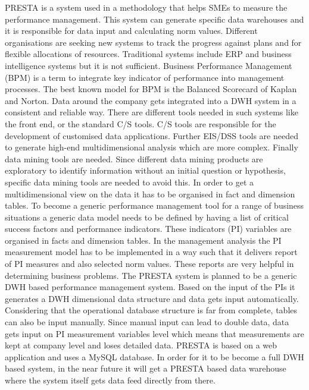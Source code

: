 \documentclass[../paper.tex]{subfiles}
\begin{document}
PRESTA is a system used in a methodology that helps SMEs to measure the performance management. This system can generate specific data warehouses and it is responsible for data input and calculating norm values. Different organisations are seeking new systems to track the progress against plans and for flexible allocations of resources. Traditional systems include ERP and business intelligence systems but it is not sufficient. Business Performance Management (BPM) is a term to integrate key indicator of performance into management processes. The best known model for BPM is the Balanced Scorecard of Kaplan and Norton. Data around the company gets integrated into a DWH system in a consistent and reliable way. There are different tools needed in such systems like the front end, or the standard C/S tools. C/S tools are responsible for the development of customised data applications. Further EIS/DSS tools are needed to generate high-end multidimensional analysis which are more complex. Finally data mining tools are needed. Since different data mining products are exploratory to identify information without an initial question or hypothesis, specific data mining tools are needed to avoid this. In order to get a multidimensional view on the data it has to be organised in fact and dimension tables. To become a generic performance management tool for a range of business situations a generic data model needs to be defined by having a list of critical success factors and performance indicators. These indicators (PI) variables are organised in facts and dimension tables. In the management analysis the PI measurement model has to be implemented in a way such that it delivers report of PI measures and also selected norm values. These reports are very helpful in determining business problems. The PRESTA system is planned to be a generic DWH based performance management system. Based on the input of the PIs it generates a DWH dimensional data structure and data gets input automatically. Considering that the operational database structure is far from complete, tables can also be input manually. Since manual input can lead to double data, data gets input on PI measurement variables level which means that measurements are kept at company level and loses detailed data. PRESTA is based on a web application and uses a MySQL database. In order for it to be become a full DWH based system, in the near future it will get a PRESTA based data warehouse where the system itself gets data feed directly from there.~\cite{Schreurs2007}
\end{document}
